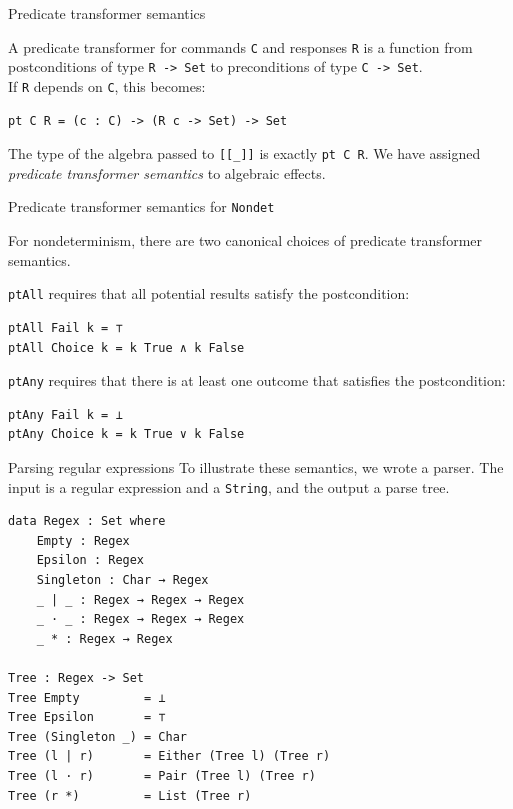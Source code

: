 \documentclass[ignorenonframetext,]{beamer}
\newcommand{\Agda}[1]{\texttt{#1}\xspace}
\newcommand{\Nondet}{\Agda{Nondet}}
\begin{document}
\begin{frame}[fragile]{Predicate transformer semantics}

A predicate transformer for commands \Agda{C} and responses \Agda{R}
is a function from postconditions of type \Agda{R -> Set} to preconditions of type \Agda{C -> Set}.\\
If \Agda{R} depends on \Agda{C}, this becomes:

\begin{verbatim}
pt C R = (c : C) -> (R c -> Set) -> Set
\end{verbatim}

The type of the algebra passed to \Agda{[[\_]]} is exactly \Agda{pt C R}.
We have assigned \emph{predicate transformer semantics} to algebraic effects.

\end{frame}

\begin{frame}[fragile]{Predicate transformer semantics for \Nondet}

For nondeterminism, there are two canonical choices of predicate transformer semantics.

\Agda{ptAll} requires that all potential results satisfy the postcondition:
\begin{verbatim}
ptAll Fail k = ⊤
ptAll Choice k = k True ∧ k False
\end{verbatim}

\Agda{ptAny} requires that there is at least one outcome that satisfies the postcondition:
\begin{verbatim}
ptAny Fail k = ⊥
ptAny Choice k = k True ∨ k False
\end{verbatim}

\end{frame}

\begin{frame}[fragile]{Parsing regular expressions}
To illustrate these semantics, we wrote a parser.
The input is a regular expression and a \Agda{String}, and the output a parse tree.
\begin{verbatim}
data Regex : Set where
    Empty : Regex
    Epsilon : Regex
    Singleton : Char → Regex
    _ | _ : Regex → Regex → Regex
    _ · _ : Regex → Regex → Regex
    _ * : Regex → Regex

Tree : Regex -> Set
Tree Empty         = ⊥
Tree Epsilon       = ⊤
Tree (Singleton _) = Char
Tree (l | r)       = Either (Tree l) (Tree r)
Tree (l · r)       = Pair (Tree l) (Tree r)
Tree (r *)         = List (Tree r)
\end{verbatim}
\end{frame}
\end{document}
